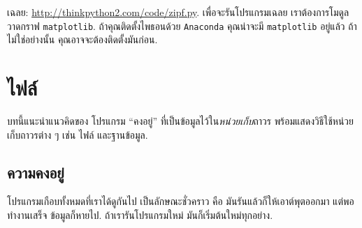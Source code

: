 \begin{exercise}

เฉลย:
 \url{http://thinkpython2.com/code/zipf.py}.
เพื่อจะรันโปรแกรมเฉลย เราต้องการโมดูลวาดกราฟ \texttt{matplotlib}.
ถ้าคุณติดตั้งไพธอนด้วย \texttt{Anaconda}
คุณน่าจะมี \texttt{matplotlib} อยู่แล้ว
ถ้าไม่ใช่อย่างนั้น คุณอาจจะต้องติดตั้งมันก่อน.


\end{exercise}
\vspace{0.5cm}



\chapter{ไฟล์}


บทนี้แนะนำแนวคิดของ โปรแกรม ``คงอยู่''
ที่เป็นข้อมูลไว้ใน\textit{หน่วยเก็บ}ถาวร
พร้อมแสดงวิธีใช้หน่วยเก็บถาวรต่าง ๆ เช่น ไฟล์ และฐานข้อมูล.

\section{ความคงอยู่}



โปรแกรมเกือบทั้งหมดที่เราได้ดูกันไป เป็นลักษณะชั่วคราว
คือ มันรันแล้วก็ให้เอาต์พุตออกมา
แต่พอทำงานเสร็จ ข้อมูลก็หายไป.
ถ้าเรารันโปรแกรมใหม่ มันก็เริ่มต้นใหม่ทุกอย่าง.


